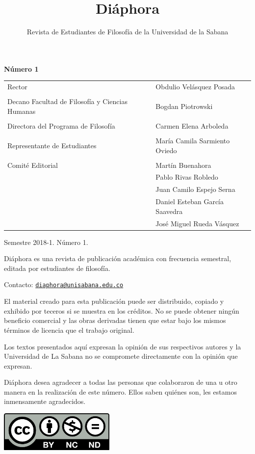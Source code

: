 \documentclass[]{book}
\begin{document}
\pagestyle{fancy}
	
\title{Diáphora}
\author{Revista de Estudiantes de Filosofía de la Universidad de la
Sabana}

\maketitle


\textbf{Número 1}



\begin{longtable}[]{@{}ll@{}}
\toprule
\midrule
\endhead
Rector & Obdulio Velásquez Posada\tabularnewline
&\tabularnewline
Decano Facultad de Filosofía y Ciencias Humanas & Bogdan
Piotrowski\tabularnewline
&\tabularnewline
Directora del Programa de Filosofía & Carmen Elena
Arboleda\tabularnewline
&\tabularnewline
Representante de Estudiantes & María Camila Sarmiento
Oviedo\tabularnewline
&\tabularnewline
Comité Editorial & Martín Buenahora \tabularnewline
& Pablo Rivas Robledo\tabularnewline
& Juan Camilo Espejo Serna\tabularnewline
& Daniel Esteban García Saavedra\tabularnewline
& José Miguel Rueda Vásquez\tabularnewline
\bottomrule
\end{longtable}

\noindent Semestre 2018-1. Número 1.

\noindent Diáphora es una revista de publicación académica con frecuencia
semestral, editada por estudiantes de filosofía.

\noindent Contacto: \href{mailto:diaphora@unisabana.edu.co}{\nolinkurl{diaphora@unisabana.edu.co}}



El material creado para esta publicación puede ser distribuido, copiado
y exhibido por teceros si se muestra en los créditos. No se puede
obtener ningún beneficio comercial y las obras derivadas tienen que
estar bajo los mismos términos de licencia que el trabajo original.

Los textos presentados aquí expresan la opinión de sus respectivos
autores y la Universidad de La Sabana no se compromete directamente con
la opinión que expresan.

Diáphora desea agradecer a todas las personas que colaboraron de una u
otro manera en la realización de este número. Ellos saben quiénes son,
les estamos inmensamente agradecidos.
\begin{center}
\includegraphics[width=2.24419in,height=0.78333in]{media/image1.png}
\end{center}
\end{document}
